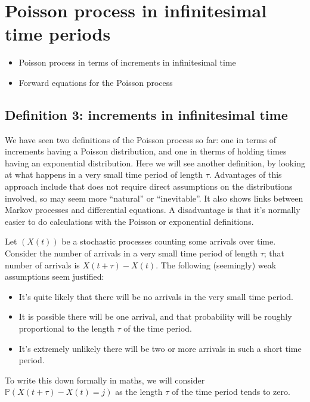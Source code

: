 \documentclass[
  a4paper,
]{article}
\providecommand{\tightlist}{%
  \setlength{\itemsep}{0pt}\setlength{\parskip}{0pt}}
\theoremstyle{definition}
\theoremstyle{definition}
\theoremstyle{definition}
\theoremstyle{remark}
\begin{document}
\hypertarget{S15-poisson-infinitesimal}{%
\section{Poisson process in infinitesimal time periods}\label{S15-poisson-infinitesimal}}

\begin{itemize}
\tightlist
\item
  Poisson process in terms of increments in infinitesimal time
\item
  Forward equations for the Poisson process
\end{itemize}

\hypertarget{infinitesimal}{%
\subsection{Definition 3: increments in infinitesimal time}\label{infinitesimal}}

We have seen two definitions of the Poisson process so far: one in terms of increments having a Poisson distribution, and one in therms of holding times having an exponential distribution. Here we will see another definition, by looking at what happens in a very small time period of length \(\tau\). Advantages of this approach include that does not require direct assumptions on the distributions involved, so may seem more ``natural'' or ``inevitable''. It also shows links between Markov processes and differential equations. A disadvantage is that it's normally easier to do calculations with the Poisson or exponential definitions.

Let \((X(t))\) be a stochastic processes counting some arrivals over time. Consider the number of arrivals in a very small time period of length \(\tau\); that number of arrivals is \(X(t+\tau) - X(t)\). The following (seemingly) weak assumptions seem justified:

\begin{itemize}
\tightlist
\item
  It's quite likely that there will be no arrivals in the very small time period.
\item
  It is possible there will be one arrival, and that probability will be roughly proportional to the length \(\tau\) of the time period.
\item
  It's extremely unlikely there will be two or more arrivals in such a short time period.
\end{itemize}

To write this down formally in maths, we will consider \(\mathbb P(X(t+\tau) - X(t) = j)\) as the length \(\tau\) of the time period tends to zero.
\end{document}
